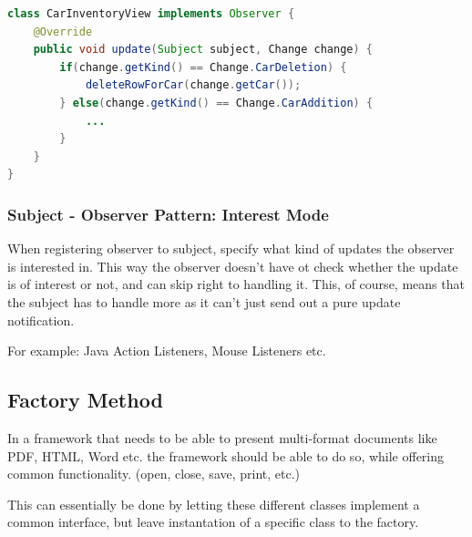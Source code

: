 \documentclass[
    ../../Software_Engineering_Summary.tex,
]
{subfiles}
\begin{document}
\begin{codebox}
    \begin{lstlisting}[language=Java]
class CarInventoryView implements Observer {
    @Override
    public void update(Subject subject, Change change) {
        if(change.getKind() == Change.CarDeletion) {
            deleteRowForCar(change.getCar());
        } else(change.getKind() == Change.CarAddition) {
            ...                    
        }
    }
}\end{lstlisting}
\end{codebox}

\subsubsection{Subject - Observer Pattern: Interest Mode}

When registering observer to subject, specify what kind of updates the observer is interested in. This way the observer doesn't have ot check whether the update is of interest or not, and can skip right to handling it. This, of course, means that the subject has to handle more as it can't just send out a pure update notification.

For example: Java Action Listeners, Mouse Listeners etc.

\newpage
\subsection{Factory Method}

In a framework that needs to be able to present multi-format documents like PDF, HTML, Word etc. the framework should be able to do so, while offering common functionality. (open, close, save, print, etc.) 

This can essentially be done by letting these different classes implement a common interface, but leave instantation of a specific class to the factory.
\end{document}
